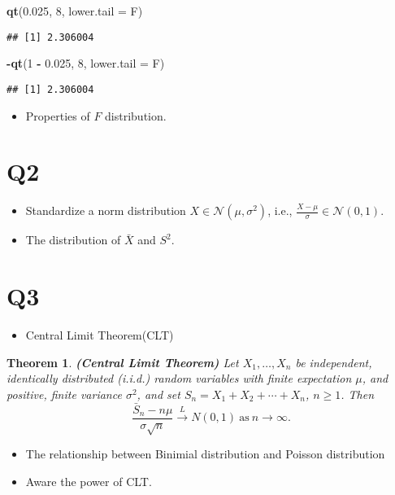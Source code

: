 \documentclass[
]{book}
\newenvironment{Shaded}{\begin{snugshade}}{\end{snugshade}}
\newcommand{\DataTypeTok}[1]{\textcolor[rgb]{0.13,0.29,0.53}{#1}}
\newcommand{\DecValTok}[1]{\textcolor[rgb]{0.00,0.00,0.81}{#1}}
\newcommand{\FloatTok}[1]{\textcolor[rgb]{0.00,0.00,0.81}{#1}}
\newcommand{\KeywordTok}[1]{\textcolor[rgb]{0.13,0.29,0.53}{\textbf{#1}}}
\newcommand{\NormalTok}[1]{#1}
\newcommand{\OperatorTok}[1]{\textcolor[rgb]{0.81,0.36,0.00}{\textbf{#1}}}
\newcommand{\StringTok}[1]{\textcolor[rgb]{0.31,0.60,0.02}{#1}}
\providecommand{\tightlist}{%
  \setlength{\itemsep}{0pt}\setlength{\parskip}{0pt}}
\newtheorem{theorem}{Theorem}[chapter]
\theoremstyle{definition}
\theoremstyle{definition}
\theoremstyle{definition}
\theoremstyle{remark}
\begin{document}
\begin{Shaded}
\begin{Highlighting}[]
\KeywordTok{qt}\NormalTok{(}\FloatTok{0.025}\NormalTok{, }\DecValTok{8}\NormalTok{, }\DataTypeTok{lower.tail =}\NormalTok{ F)}
\end{Highlighting}
\end{Shaded}

\begin{verbatim}
## [1] 2.306004
\end{verbatim}

\begin{Shaded}
\begin{Highlighting}[]
\OperatorTok{-}\KeywordTok{qt}\NormalTok{(}\DecValTok{1} \OperatorTok{-}\StringTok{ }\FloatTok{0.025}\NormalTok{, }\DecValTok{8}\NormalTok{, }\DataTypeTok{lower.tail =}\NormalTok{ F)}
\end{Highlighting}
\end{Shaded}

\begin{verbatim}
## [1] 2.306004
\end{verbatim}

\begin{itemize}
\tightlist
\item
  Properties of \(F\) distribution.
\end{itemize}

\hypertarget{q2}{%
\section{Q2}\label{q2}}

\begin{itemize}
\item
  Standardize a norm distribution \(X\in\mathcal{N}(\mu,\sigma^2)\), i.e., \(\frac{X-\mu}{\sigma}\in\mathcal{N}(0,1)\).
\item
  The distribution of \(\bar X\) and \(S^2\).
\end{itemize}

\hypertarget{q3}{%
\section{Q3}\label{q3}}

\begin{itemize}
\tightlist
\item
  Central Limit Theorem(CLT)
\end{itemize}

\begin{theorem}
\protect\hypertarget{thm:clt}{}{\label{thm:clt} }\textbf{(Central Limit Theorem)} Let \(X_1,\ldots,X_n\) be independent, identically
distributed (i.i.d.) random variables with finite expectation \(\mu\), and
positive, finite variance \(\sigma^2\), and set \(S_n=X_1 + X_2 + \cdots + X_n\), \(n \ge 1\). Then
\[
    \frac{\bar{S}_n - n\mu}{\sigma \sqrt{n}}\xrightarrow{L} N(0, 1)
    ~\mathrm{as}~n\rightarrow\infty.
\]
\end{theorem}

\begin{itemize}
\item
  The relationship between Binimial distribution and Poisson distribution
\item
  Aware the power of CLT.
\end{itemize}

  
\end{document}
